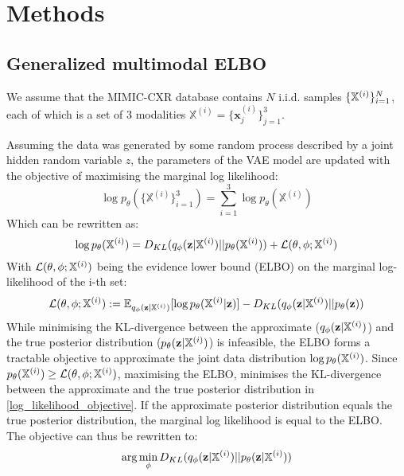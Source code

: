 \section{Methods}
\subsection{Generalized multimodal ELBO}

We assume that the MIMIC-CXR database contains $N$ i.i.d. samples $\{\mathbb{X}^{(i)}\}^N_{i=1}$, each of which is a set of 3 modalities $\mathbb{X}^{(i)} = \{\textbf{x}_j^{(i)}\}^3_{j=1}$.

Assuming the data was generated by some random process described by a joint hidden random variable $z$, the parameters of the VAE model are updated with the objective of maximising the marginal log likelihood:
\begin{equation}
    \log p_{\theta}(\{\mathbb{X}^{(i)}\}_{i=1}^3) = \sum _{i=1}^3 \log p_{\theta}(\mathbb{X}^{(i)})
\end{equation}
Which can be rewritten as:
\begin{equation}\label{log_likelihood_objective}
    \log p_{\theta}(\mathbb{X}^{(i)}) = D_{KL}(q_{\phi}(\textbf{z}|\mathbb{X}^{(i)})||p_{\theta}(\mathbb{X}^{(i)})) + \mathcal{L}(\theta, \phi; \mathbb{X}^{(i)})
\end{equation}
With $\mathcal{L}(\theta, \phi; \mathbb{X}^{(i)})$ being the evidence lower bound (ELBO) on the marginal log-likelihood of the i-th set:
\begin{equation}
    \mathcal{L}(\theta, \phi; \mathbb{X}^{(i)}) := \mathbb{E}_{q_{\phi}(\textbf{z}|\mathbb{X}^{(i)})}[\log p_{\theta}(\mathbb{X}^{(i)}|\textbf{z})] - D_{KL}(q_{\phi}(\textbf{z}|\mathbb{X}^{(i)})||p_{\theta}(\textbf{z}))
\end{equation}
While minimising the KL-divergence between the approximate ($q_{\phi}(\textbf{z}|\mathbb{X}^{(i)})$) and the true posterior distribution ($p_{\theta}(\textbf{z}|\mathbb{X}^{(i)})$) is infeasible, the ELBO forms a tractable objective to approximate the joint data distribution $\log p_{\theta}(\mathbb{X}^{(i)})$.
Since $p_{\theta}(\mathbb{X}^{(i)}) \geq \mathcal{L}(\theta, \phi; \mathbb{X}^{(i)})$, maximising the ELBO, minimises the KL-divergence between the approximate and the true posterior distribution in \cref{log_likelihood_objective}.
If the approximate posterior distribution equals the true posterior distribution, the marginal log likelihood is equal to the ELBO.\\
The objective can thus be rewritten to:
\begin{equation}
    \arg \min _{\phi} D_{KL}(q_{\phi}(\textbf{z}|\mathbb{X}^{(i)})||p_{\theta}(\textbf{z}|\mathbb{X}^{(i)}))
\end{equation}

